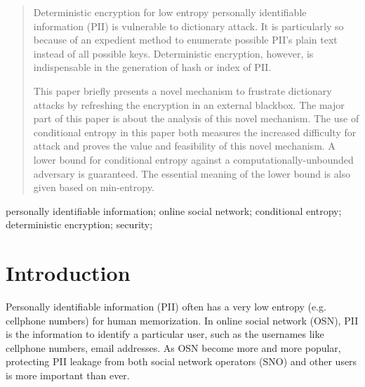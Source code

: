 \documentclass[10pt, conference, compsocconf]{IEEEtran}
\begin{document}




\maketitle


\begin{abstract}
    Deterministic encryption for low entropy personally identifiable information
    (PII) is vulnerable
    to dictionary attack. It is particularly so because
    of an expedient method to enumerate possible PII's
    plain text instead of all possible keys.
    Deterministic encryption, however,
    is indispensable in the generation of hash or index of PII.

    This paper briefly presents a novel mechanism
    to frustrate dictionary attacks
    by refreshing the encryption in an external blackbox.
    The major part of this paper is about the analysis
    of this novel mechanism.
    The use of conditional entropy in this paper both measures the increased
    difficulty for attack and proves the value and feasibility
    of this novel mechanism.
    A lower bound for conditional entropy
    against a computationally-unbounded adversary is guaranteed.
    The essential meaning of the lower bound is also
    given based on min-entropy.

\end{abstract}

\begin{IEEEkeywords}
personally identifiable information; online social network; conditional entropy; deterministic encryption;
security;

\end{IEEEkeywords}


%
\IEEEpeerreviewmaketitle



\section{Introduction}
    Personally identifiable information (PII) often has
    a very low entropy (e.g. cellphone numbers) for human memorization.
    In online social network (OSN), PII is the information
    to identify a particular user, such as the usernames like cellphone numbers,
    email addresses.
    As OSN become more and more popular,
    protecting PII leakage from both social network operators (SNO)
    and other users is more important than ever.
\end{document}
